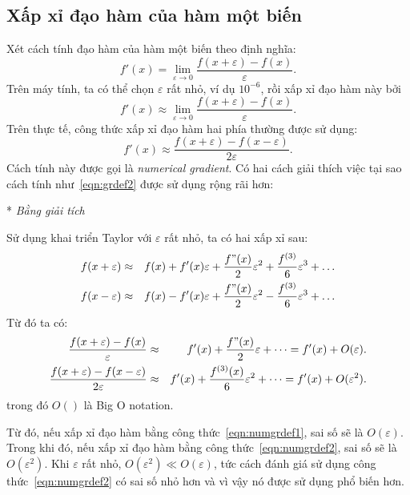 \subsection{Xấp xỉ đạo hàm của hàm một biến}
\label{sub:xap_xi_dao_ham_cua_ham_mot_bien}
Xét cách tính đạo hàm của hàm một biến theo định nghĩa:
\begin{equation}
\label{eqn:grdef1}
f'(x) = \lim_{\varepsilon \rightarrow 0}\frac{f(x + \varepsilon) -
f(x)}{\varepsilon}.
\end{equation}
Trên máy tính, ta có thể chọn $\varepsilon$ rất nhỏ, ví dụ $10^{-6}$, rồi xấp xỉ đạo hàm này bởi
\begin{equation}
f'(x) \approx \lim_{\varepsilon \rightarrow 0}\frac{f(x + \varepsilon) -
f(x)}{\varepsilon}.
\end{equation}
Trên thực tế, công thức xấp xỉ đạo hàm hai phía thường được sử dụng:
\begin{equation}
\label{eqn:grdef2}
f'(x) \approx \frac{f(x + \varepsilon) - f(x - \varepsilon)}{2\varepsilon}.
\end{equation}
Cách tính này được gọi là \textit{numerical gradient}. Có hai cách giải thích việc tại sao cách tính như~\eqref{eqn:grdef2} được sử dụng rộng rãi hơn:

* \textit{Bằng giải tích}

Sử dụng khai triển Taylor với $\varepsilon$ rất nhỏ, ta có hai xấp xỉ sau:
\begin{eqnarray}
f(x + \varepsilon) &\approx& f(x) + f'(x)\varepsilon + \frac{f"(x)}{2}
\varepsilon^2 + \frac{f^{(3)}}{6}\varepsilon^3 + \dots \\
f(x - \varepsilon) &\approx& f(x) - f'(x)\varepsilon + \frac{f"(x)}{2}
\varepsilon^2 - \frac{f^{(3)}}{6}\varepsilon^3 + \dots
\end{eqnarray}
%
Từ đó ta có:
\begin{eqnarray}
\label{eqn:numgrdef1}
\frac{f(x + \varepsilon) - f(x)}{\varepsilon} &\approx& f'(x) +
\frac{f"(x)}{2}\varepsilon + \dots =  f'(x) + O(\varepsilon). \\
\label{eqn:numgrdef2}
\frac{f(x + \varepsilon) - f(x - \varepsilon)}{2\varepsilon} &\approx& f'(x) +
\frac{f^{(3)}(x)}{6}\varepsilon^2 + \dots =  f'(x) + O(\varepsilon^2).
\end{eqnarray}
trong đó $O()$ là {Big O notation}.

Từ đó, nếu xấp xỉ đạo hàm bằng công thức~\eqref{eqn:numgrdef1}, sai số sẽ là $O(\varepsilon)$. Trong khi đó, nếu xấp xỉ đạo hàm bằng công
thức~\eqref{eqn:numgrdef2}, sai số sẽ là
$O(\varepsilon^2)$. Khi $\varepsilon$ rất nhỏ, $O(\varepsilon^2) \ll
O(\varepsilon)$, tức cách đánh giá sử dụng công thức~\eqref{eqn:numgrdef2} có sai
số nhỏ hơn và vì vậy nó được sử dụng phổ biến hơn.

